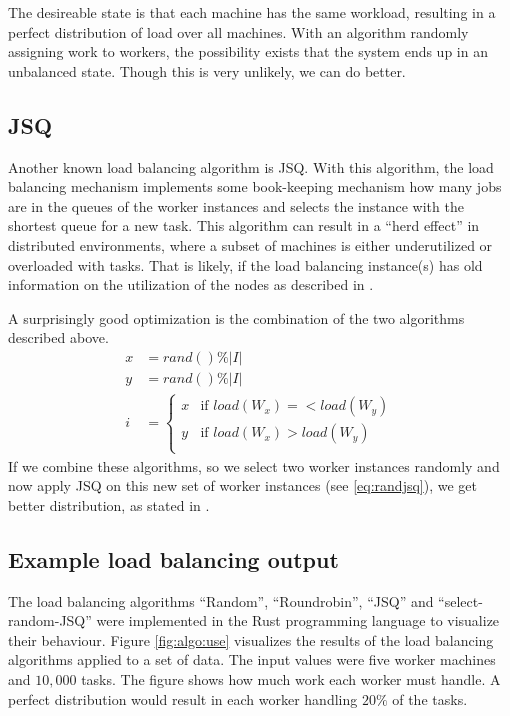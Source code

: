 The desireable state is that each machine has the same workload, resulting in a
perfect distribution of load over all machines.
With an algorithm randomly assigning work to workers, the possibility exists
that the system ends up in an unbalanced state.
Though this is very unlikely, we can do better.

\subsection{\ac{JSQ}}

Another known load balancing algorithm is \ac{JSQ}.
With this algorithm, the load balancing mechanism implements some book-keeping
mechanism how many jobs are in the queues of the worker instances and selects
the instance with the shortest queue for a new task.
This algorithm can result in a ``herd effect'' in distributed environments,
where a subset of machines is either underutilized or overloaded with tasks.
That is likely, if the load balancing instance(s) has old information on the
utilization of the nodes as described in \cite{inpSLoadInfo}.

A surprisingly good optimization is the combination of the two algorithms
described above.
\begin{equation}
    \begin{aligned}
        x &= rand() \% |I| \\
        y &= rand() \% |I| \\
        i &= \begin{cases}
            x & \text{if } load(W_x) =< load(W_y)\\
            y & \text{if } load(W_x) > load(W_y)\\
        \end{cases}
    \end{aligned}
    \label{eq:randjsq}
\end{equation}
If we combine these algorithms, so we select two worker instances randomly and
now apply \ac{JSQ} on this new set of worker instances (see \ref{eq:randjsq}),
we get better distribution, as stated in \cite{powerOfTwoInRLB}.

\subsection{Example load balancing output}

The load balancing algorithms ``Random'', ``Roundrobin'', ``\ac{JSQ}'' and
``select-random-\ac{JSQ}'' were implemented in the Rust programming language to
visualize their behaviour.
Figure \ref{fig:algo:use} visualizes the results of the load balancing
algorithms applied to a set of data.
The input values were five worker machines and $10,000$ tasks.
The figure shows how much work each worker must handle.
A perfect distribution would result in each worker handling $20\%$ of the tasks.

